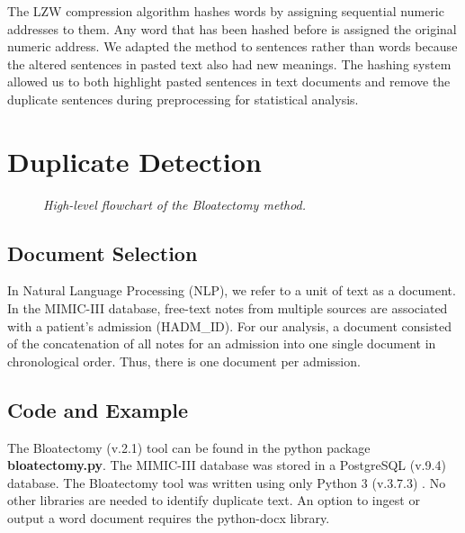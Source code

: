 \documentclass[runningheads,a4paper]{llncs}
\begin{document}
\noindent The LZW compression algorithm \cite{Welch:1984} hashes words by assigning sequential numeric addresses to them. Any word that has been hashed before is assigned the original numeric address. We adapted the method to sentences rather than words because the altered sentences in pasted text also had new meanings. The hashing system allowed us to both highlight pasted sentences in text documents and remove the duplicate sentences during preprocessing for statistical analysis.

\section{Duplicate Detection}
\begin{figure}
 \caption {\emph{High-level flowchart of the Bloatectomy method.}}
 \label{flowchart}
\end{figure}

\subsection{Document Selection}
\noindent In Natural Language Processing (NLP), we refer to a unit of text as a document. In the MIMIC-III database, free-text notes from multiple sources are associated with a patient's admission (HADM\_ID). For our analysis, a document consisted of the concatenation of all notes for an admission into one single document in chronological order. Thus, there is one document per admission.

\subsection{Code and Example}
\noindent The Bloatectomy (v.2.1) tool can be found in the python package \textbf{bloatectomy.py}. The MIMIC-III database was stored in a PostgreSQL (v.9.4) database. The Bloatectomy tool was written using only Python 3 (v.3.7.3) \cite{python3}. No other libraries are needed to identify duplicate text. An option to ingest or output a word document requires the python-docx library.
\end{document}
